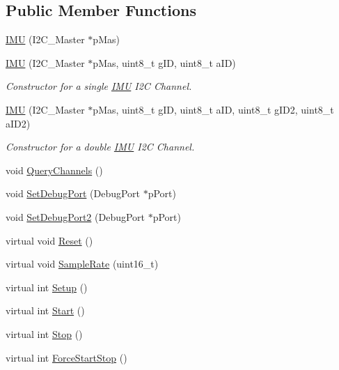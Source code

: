 \subsection*{Public Member Functions}
\begin{DoxyCompactItemize}
\item 
\hyperlink{class_i_m_u_ab77a4c6c64f65642c42ebbf55a4e7a1e}{IMU} (I2C\_\-Master $\ast$pMas)
\item 
\hyperlink{class_i_m_u_aa628daa06d0e29e4aa84bb8336649134}{IMU} (I2C\_\-Master $\ast$pMas, uint8\_\-t gID, uint8\_\-t aID)
\begin{DoxyCompactList}\small\item\em Constructor for a single \hyperlink{class_i_m_u}{IMU} I2C Channel. \item\end{DoxyCompactList}\item 
\hyperlink{class_i_m_u_ac3b25bbd72ae020b61012fd4ebf8a188}{IMU} (I2C\_\-Master $\ast$pMas, uint8\_\-t gID, uint8\_\-t aID, uint8\_\-t gID2, uint8\_\-t aID2)
\begin{DoxyCompactList}\small\item\em Constructor for a double \hyperlink{class_i_m_u}{IMU} I2C Channel. \item\end{DoxyCompactList}\item 
void \hyperlink{class_i_m_u_a496602369b71a85051ba0506a8af70a1}{QueryChannels} ()
\item 
void \hyperlink{class_i_m_u_afedf46bdad68cb4002af8bf46530d265}{SetDebugPort} (DebugPort $\ast$pPort)
\item 
void \hyperlink{class_i_m_u_a6f86c79e66c4262093c2d65fe3fee45c}{SetDebugPort2} (DebugPort $\ast$pPort)
\item 
virtual void \hyperlink{class_i_m_u_a13191357ff93d02f6cc7aa7e55b13d67}{Reset} ()
\item 
virtual void \hyperlink{class_i_m_u_a7705d9d642b093a670e78534c9b2d3db}{SampleRate} (uint16\_\-t)
\item 
virtual int \hyperlink{class_i_m_u_a290737d42de965c15c8327edfc516ffd}{Setup} ()
\item 
virtual int \hyperlink{class_i_m_u_a7c03f7a423240538756a62441b298d01}{Start} ()
\item 
virtual int \hyperlink{class_i_m_u_af0841bed4167f7a4eb12c40d7b8e615e}{Stop} ()
\item 
virtual int \hyperlink{class_i_m_u_a004d2bb9e6155f45edc9e46bce730644}{ForceStartStop} ()
\item 

\end{DoxyCompactItemize}
